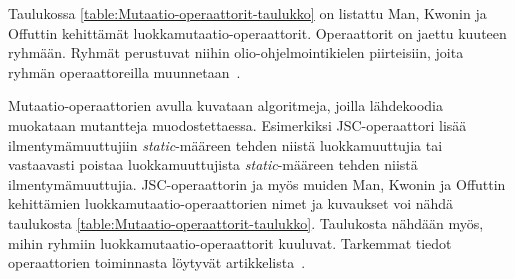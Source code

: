 \documentclass[finnish, grading]{tktltiki2}
\theoremstyle{definition}
\theoremstyle{remark}
\begin{document}
Taulukossa \ref{table:Mutaatio-operaattorit-taulukko} on listattu Man, Kwonin ja Offuttin kehittämät luok\-ka\-mu\-taa\-ti\-o-o\-pe\-raat\-to\-rit. Operaattorit on jaettu kuuteen ryhmään. Ryhmät perustuvat niihin olio-ohjelmointikielen piirteisiin, joita ryhmän operaattoreilla muunnetaan~\cite[s. 355]{Ma:Kwon:Offutt:2002}.

Mutaatio-operaattorien avulla kuvataan algoritmeja, joilla lähdekoodia muokataan mutantteja muodostettaessa. Esimerkiksi JSC-operaattori lisää ilmentymämuuttujiin \textit{static}-määreen tehden niistä luokkamuuttujia tai vastaavasti poistaa luokkamuuttujista \textit{static}-määreen tehden niistä ilmentymämuuttujia. JSC-operaattorin ja myös muiden Man, Kwonin ja Offuttin kehittämien luokkamutaatio-operaattorien nimet ja kuvaukset voi nähdä taulukosta \ref{table:Mutaatio-operaattorit-taulukko}. Taulukosta nähdään myös, mihin ryhmiin luokkamutaatio-operaattorit kuuluvat. Tarkemmat tiedot operaattorien toiminnasta löytyvät artikkelista~\cite{Ma:Kwon:Offutt:2002}. 
\end{document}
